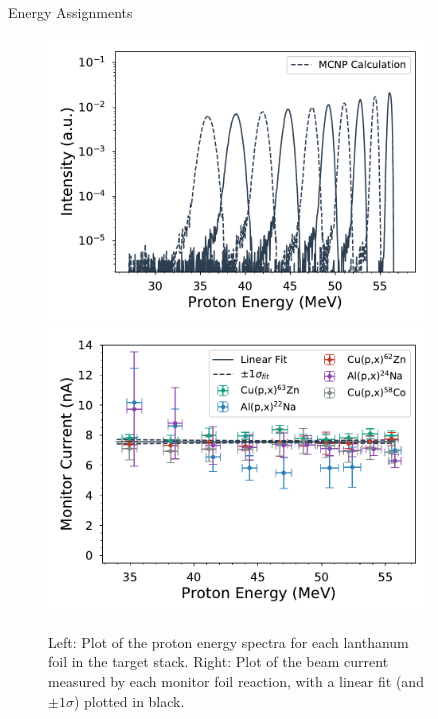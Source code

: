 \documentclass[final]{beamer}
\newlength{\sepwid}
\newlength{\onecolwid}
\newlength{\twocolwid}
\begin{document}
\begin{frame}[t]
\begin{columns}[t]
\begin{column}{\twocolwid}
\begin{columns}[t,totalwidth=\twocolwid]
\begin{column}{\onecolwid}
\begin{block}{Energy Assignments}
\begin{figure}
\includegraphics[width=0.48\linewidth]{monitors/La_mcnp_spectrum.pdf}
\includegraphics[width=0.48\linewidth]{monitors/current_norm_mcnp.pdf}
\caption{Left: Plot of the proton energy spectra for each lanthanum foil in the target stack. Right: Plot of the beam current measured by each monitor foil reaction, with a linear fit (and $\pm 1 \sigma$) plotted in black.}
\end{figure}

\end{block}
\end{column} %
\end{columns} %
\end{column} %
\begin{column}{\sepwid}\end{column} %
\begin{column}{\onecolwid} %


\end{column}
\end{columns}
\end{frame}
\end{document}
